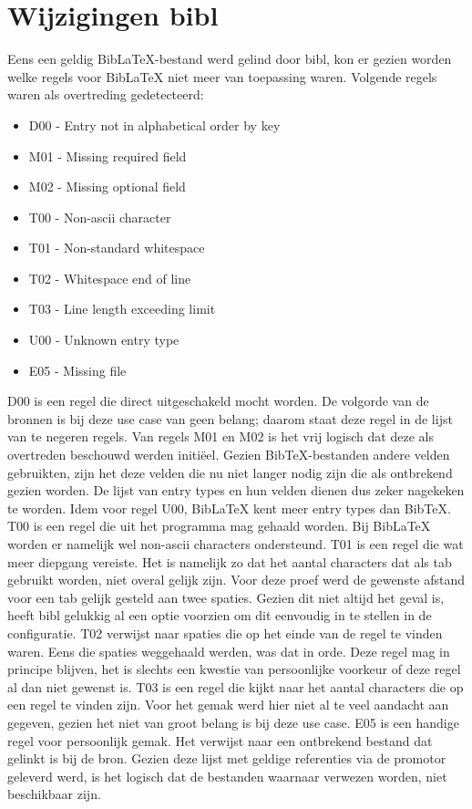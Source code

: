 \section{Wijzigingen bibl}

Eens een geldig BibLaTeX-bestand werd gelind door bibl, kon er gezien worden welke regels voor BibLaTeX niet meer van toepassing waren. Volgende regels waren als overtreding gedetecteerd:
\begin{itemize}
    \item D00 - Entry not in alphabetical order by key
    \item M01 - Missing required field
    \item M02 - Missing optional field
    \item T00 - Non-ascii character
    \item T01 - Non-standard whitespace
    \item T02 - Whitespace end of line
    \item T03 - Line length exceeding limit
    \item U00 - Unknown entry type
    \item E05 - Missing file
\end{itemize}

D00 is een regel die direct uitgeschakeld mocht worden. De volgorde van de bronnen is bij deze use case van geen belang; daarom staat deze regel in de lijst van te negeren regels. 
Van regels M01 en M02 is het vrij logisch dat deze als overtreden beschouwd werden initiëel. Gezien BibTeX-bestanden andere velden gebruikten, zijn het deze velden die nu niet langer nodig zijn die als ontbrekend gezien worden. De lijst van entry types en hun velden dienen dus zeker nagekeken te worden. Idem voor regel U00, BibLaTeX kent meer entry types dan BibTeX.
T00 is een regel die uit het programma mag gehaald worden. Bij BibLaTeX worden er namelijk wel non-ascii characters ondersteund. T01 is een regel die wat meer diepgang vereiste. Het is namelijk zo dat het aantal characters dat als tab gebruikt worden, niet overal gelijk zijn. Voor deze proef werd de gewenste afstand voor een tab gelijk gesteld aan twee spaties. Gezien dit niet altijd het geval is, heeft bibl gelukkig al een optie voorzien om dit eenvoudig in te stellen in de configuratie.
T02 verwijst naar spaties die op het einde van de regel te vinden waren. Eens die spaties weggehaald werden, was dat in orde. Deze regel mag in principe blijven, het is slechts een kwestie van persoonlijke voorkeur of deze regel al dan niet gewenst is.
T03 is een regel die kijkt naar het aantal characters die op een regel te vinden zijn. Voor het gemak werd hier niet al te veel aandacht aan gegeven, gezien het niet van groot belang is bij deze use case. 
E05 is een handige regel voor persoonlijk gemak. Het verwijst naar een ontbrekend bestand dat gelinkt is bij de bron. Gezien deze lijst met geldige referenties via de promotor geleverd werd, is het logisch dat de bestanden waarnaar verwezen worden, niet beschikbaar zijn.

